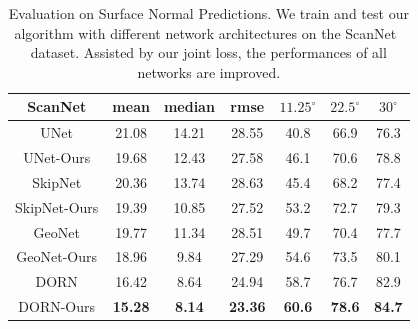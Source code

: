 \begin{table}
    \centering
    \tabcolsep=0.08cm
    \small
    \begin{tabular}{|c|c|c|c||c|c|c|}
        \hline
         \textbf{ScanNet} & mean & median & rmse & $11.25^\circ$ & $22.5^\circ$ & $30^\circ$\\
         \hline
         UNet & 21.08 & 14.21 & 28.55 & 40.8 & 66.9 & 76.3\\
         \hline
         UNet-Ours & 19.68 & 12.43 & 27.58 & 46.1 & 70.6 & 78.8\\
         \hline
         SkipNet & 20.36 & 13.74 & 28.63 & 45.4 & 68.2 & 77.4\\
         \hline
         SkipNet-Ours & 19.39 & 10.85 & 27.52 & 53.2 & 72.7 & 79.3\\
         \hline
         GeoNet & 19.77 & 11.34 & 28.51 & 49.7 & 70.4 & 77.7\\
         \hline
         GeoNet-Ours & 18.96 & 9.84 & 27.29 & 54.6 & 73.5 & 80.1\\
         \hline
         DORN & 16.42 & 8.64 & 24.94 & 58.7 & 76.7 & 82.9\\
         \hline
         DORN-Ours & \textbf{15.28} & \textbf{8.14} & \textbf{23.36} & \textbf{60.6} & \textbf{78.6} & \textbf{84.7}\\
         \hline         
    \end{tabular}
    \caption{Evaluation on Surface Normal Predictions. We train and test our algorithm with different network architectures on the ScanNet~\cite{dai2017scannet} dataset. Assisted by our joint loss, the performances of all networks are improved.}
    \label{tab:framenet-scannet-comparison}
\end{table}

